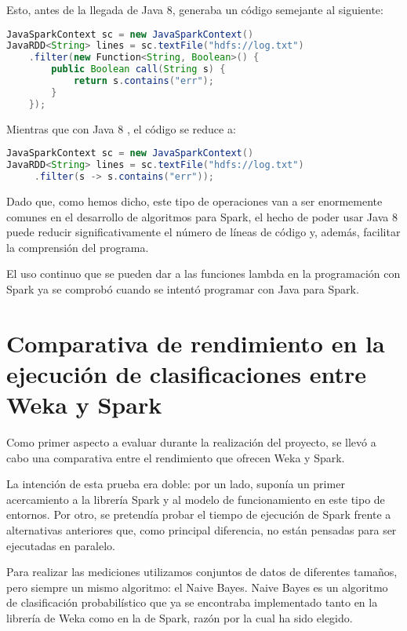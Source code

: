 Esto, antes de la llegada de Java 8, generaba un código semejante al siguiente:

\begin{lstlisting}[language=Java,tabsize=4,frame = single,caption=Código de función lambda en Java 7 \cite{Java7vs8},captionpos=b,]
JavaSparkContext sc = new JavaSparkContext()
JavaRDD<String> lines = sc.textFile("hdfs://log.txt")
	.filter(new Function<String, Boolean>() {
		public Boolean call(String s) {
			return s.contains("err");
		}
	});
\end{lstlisting}

Mientras que con Java 8 , el código se reduce a:

\begin{lstlisting}[language=Java,tabsize=4,frame = single,caption=Código de función lambda en Java 8 \cite{Java7vs8},captionpos=b,]
JavaSparkContext sc = new JavaSparkContext()
JavaRDD<String> lines = sc.textFile("hdfs://log.txt")
     .filter(s -> s.contains("err"));
\end{lstlisting}

Dado que, como hemos dicho, este tipo de operaciones van a ser enormemente comunes en el desarrollo de algoritmos para Spark, el hecho de poder usar Java 8 puede reducir significativamente el número de líneas de código y, además, facilitar la comprensión del programa.

El uso continuo que se pueden dar a las funciones lambda en la programación con Spark ya se comprobó cuando se intentó programar con Java para Spark.


\section{Comparativa de rendimiento en la ejecución de clasificaciones entre Weka y Spark}

Como primer aspecto a evaluar durante la realización del proyecto, se llevó a cabo una comparativa entre el rendimiento que ofrecen Weka y Spark.

La intención de esta prueba era doble: por un lado, suponía un primer acercamiento a la librería Spark y al modelo de funcionamiento en este tipo de entornos. Por otro, se pretendía probar el tiempo de ejecución de Spark frente a alternativas anteriores que, como principal diferencia, no están pensadas para ser ejecutadas en paralelo.

Para realizar las mediciones utilizamos conjuntos de datos de diferentes tamaños, pero siempre un mismo algoritmo: el Naive Bayes. Naive Bayes es un algoritmo de clasificación probabilístico que ya se encontraba implementado tanto en la librería de Weka como en la de Spark, razón por la cual ha sido elegido.


